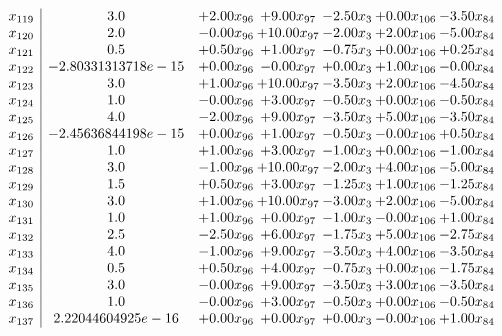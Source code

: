 \documentclass[8pt]{article}
\begin{document}
\[\begin{array}{c| c c@{\hskip 2pt} c@{\hskip 2pt} c@{\hskip 2pt} c@{\hskip 2pt} c@{\hskip 2pt} }
 x_{119}   &  3.0 & +  2.00 x_{96} & +  9.00 x_{97} & -2.50 x_{3} & +  0.00 x_{106} & -3.50 x_{84}\\
 x_{120}   &  2.0 & -0.00 x_{96} & + 10.00 x_{97} & -2.00 x_{3} & +  2.00 x_{106} & -5.00 x_{84}\\
 x_{121}   &  0.5 & +  0.50 x_{96} & +  1.00 x_{97} & -0.75 x_{3} & +  0.00 x_{106} & +  0.25 x_{84}\\
 x_{122}   &  -2.80331313718e-15 & +  0.00 x_{96} & -0.00 x_{97} & +  0.00 x_{3} & +  1.00 x_{106} & -0.00 x_{84}\\
 x_{123}   &  3.0 & +  1.00 x_{96} & + 10.00 x_{97} & -3.50 x_{3} & +  2.00 x_{106} & -4.50 x_{84}\\
 x_{124}   &  1.0 & -0.00 x_{96} & +  3.00 x_{97} & -0.50 x_{3} & +  0.00 x_{106} & -0.50 x_{84}\\
 x_{125}   &  4.0 & -2.00 x_{96} & +  9.00 x_{97} & -3.50 x_{3} & +  5.00 x_{106} & -3.50 x_{84}\\
 x_{126}   &  -2.45636844198e-15 & +  0.00 x_{96} & +  1.00 x_{97} & -0.50 x_{3} & -0.00 x_{106} & +  0.50 x_{84}\\
 x_{127}   &  1.0 & +  1.00 x_{96} & +  3.00 x_{97} & -1.00 x_{3} & +  0.00 x_{106} & -1.00 x_{84}\\
 x_{128}   &  3.0 & -1.00 x_{96} & + 10.00 x_{97} & -2.00 x_{3} & +  4.00 x_{106} & -5.00 x_{84}\\
 x_{129}   &  1.5 & +  0.50 x_{96} & +  3.00 x_{97} & -1.25 x_{3} & +  1.00 x_{106} & -1.25 x_{84}\\
 x_{130}   &  3.0 & +  1.00 x_{96} & + 10.00 x_{97} & -3.00 x_{3} & +  2.00 x_{106} & -5.00 x_{84}\\
 x_{131}   &  1.0 & +  1.00 x_{96} & +  0.00 x_{97} & -1.00 x_{3} & -0.00 x_{106} & +  1.00 x_{84}\\
 x_{132}   &  2.5 & -2.50 x_{96} & +  6.00 x_{97} & -1.75 x_{3} & +  5.00 x_{106} & -2.75 x_{84}\\
 x_{133}   &  4.0 & -1.00 x_{96} & +  9.00 x_{97} & -3.50 x_{3} & +  4.00 x_{106} & -3.50 x_{84}\\
 x_{134}   &  0.5 & +  0.50 x_{96} & +  4.00 x_{97} & -0.75 x_{3} & +  0.00 x_{106} & -1.75 x_{84}\\
 x_{135}   &  3.0 & -0.00 x_{96} & +  9.00 x_{97} & -3.50 x_{3} & +  3.00 x_{106} & -3.50 x_{84}\\
 x_{136}   &  1.0 & -0.00 x_{96} & +  3.00 x_{97} & -0.50 x_{3} & +  0.00 x_{106} & -0.50 x_{84}\\
 x_{137}   &  2.22044604925e-16 & +  0.00 x_{96} & +  0.00 x_{97} & +  0.00 x_{3} & -0.00 x_{106} & +  1.00 x_{84}\\

\end{array}\]
\end{document}
